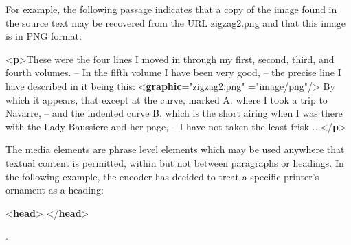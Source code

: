 \par
For example, the following passage indicates that a copy of the image found in the source text may be recovered from the URL \textsf{zigzag2.png} and that this image is in PNG format: \par\bgroup{}\exampleFont \begin{shaded}\noindent\mbox{}{<\textbf{p}>}These were the four lines I moved in\mbox{}\newline 
 through my first, second, third, and\mbox{}\newline 
 fourth volumes. -- In the fifth volume\mbox{}\newline 
 I have been very good, -- the precise\mbox{}\newline 
 line I have described in it being this:\mbox{}\newline 
{<\textbf{graphic}\hspace*{1em}{url}="{zigzag2.png}"\mbox{}\newline 
\hspace*{1em}\hspace*{1em}{mimeType}="{image/png}"/>} \mbox{}\newline 
 By which it appears, that except at the\mbox{}\newline 
 curve, marked A. where I took a trip\mbox{}\newline 
 to Navarre, -- and the indented curve B.\mbox{}\newline 
 which is the short airing when I was\mbox{}\newline 
 there with the Lady Baussiere and her\mbox{}\newline 
 page, -- I have not taken the least frisk\mbox{}\newline 
 ...{</\textbf{p}>}\end{shaded}\egroup\par \par
The media elements are phrase level elements which may be used anywhere that textual content is permitted, within but not between paragraphs or headings. In the following example, the encoder has decided to treat a specific printer's ornament as a heading: \par\bgroup{}\exampleFont \begin{shaded}\noindent\mbox{}{<\textbf{head}>}\mbox{}\newline 
{}\mbox{}\newline 
{</\textbf{head}>}\end{shaded}\egroup\par \noindent .\par
